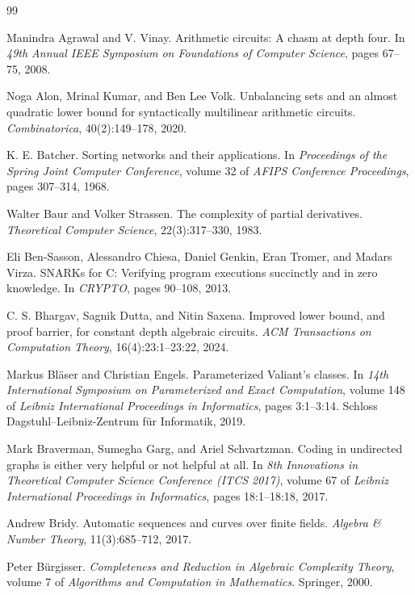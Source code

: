\begin{thebibliography}{99}
\small\raggedright
{}
Manindra Agrawal and V. Vinay. Arithmetic circuits: A chasm at depth four. In \emph{49th Annual
IEEE Symposium on Foundations of Computer Science}, pages 67--75, 2008.

Noga Alon, Mrinal Kumar, and Ben Lee Volk. Unbalancing sets and an almost quadratic lower
bound for syntactically multilinear arithmetic circuits. \emph{Combinatorica}, 40(2):149--178, 2020.

K. E. Batcher. Sorting networks and their applications. In \emph{Proceedings of the Spring Joint
Computer Conference}, volume 32 of \emph{AFIPS Conference Proceedings}, pages 307--314, 1968.

Walter Baur and Volker Strassen. The complexity of partial derivatives. \emph{Theoretical Computer
Science}, 22(3):317--330, 1983.

Eli Ben-Sasson, Alessandro Chiesa, Daniel Genkin, Eran Tromer, and Madars Virza. SNARKs
for C: Verifying program executions succinctly and in zero knowledge. In \emph{CRYPTO}, pages
90--108, 2013.

C. S. Bhargav, Sagnik Dutta, and Nitin Saxena. Improved lower bound, and proof barrier, for
constant depth algebraic circuits. \emph{ACM Transactions on Computation Theory}, 16(4):23:1--23:22,
2024.

Markus Bläser and Christian Engels. Parameterized Valiant's classes. In \emph{14th International
Symposium on Parameterized and Exact Computation}, volume 148 of \emph{Leibniz International
Proceedings in Informatics}, pages 3:1--3:14. Schloss Dagstuhl--Leibniz-Zentrum für Informatik,
2019.

Mark Braverman, Sumegha Garg, and Ariel Schvartzman. Coding in undirected graphs is either
very helpful or not helpful at all. In \emph{8th Innovations in Theoretical Computer Science Conference
(ITCS 2017)}, volume 67 of \emph{Leibniz International Proceedings in Informatics}, pages 18:1--18:18,
2017.

Andrew Bridy. Automatic sequences and curves over finite fields. \emph{Algebra \& Number Theory},
11(3):685--712, 2017.

Peter Bürgisser. \emph{Completeness and Reduction in Algebraic Complexity Theory}, volume 7 of
\emph{Algorithms and Computation in Mathematics}. Springer, 2000.


\end{thebibliography}
